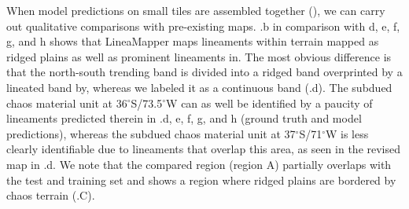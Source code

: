 
When model predictions on small tiles are assembled together (), we can carry out qualitative comparisons with pre-existing maps. .b in comparison with d, e, f, g, and h shows that LineaMapper maps lineaments within terrain mapped as ridged plains as well as prominent lineaments in. The most obvious difference is that the north-south trending band is divided into a ridged band overprinted by a lineated band by, whereas we labeled it as a continuous band (.d). 
The subdued chaos material unit at 36$^{\circ}$S/73.5$^{\circ}$W can as well be identified by a paucity of lineaments predicted therein in .d, e, f, g, and h (ground truth and model predictions), whereas the subdued chaos material unit at 37$^{\circ}$S/71$^{\circ}$W is less clearly identifiable due to lineaments that overlap this area, as seen in the revised map in .d.
We note that the compared region (region A) partially overlaps with the test and training set and shows a region where ridged plains are bordered by chaos terrain (.C).

